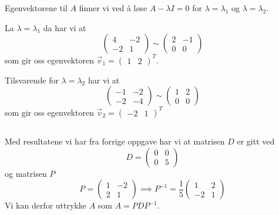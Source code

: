 \documentclass[12pt, a4paper,norsk]{article}
\newcommand{\deloppgave}{\subsection{}}
\newcommand{\inverse}{^{-1}}
\begin{document}
	Egenvektorene til $A$ finner vi ved å løse $A - \lambda I = 0$ for $\lambda = \lambda_1$ og $\lambda = \lambda_2$.
	
	La $\lambda = \lambda_1$ da har vi at
	$$
	\begin{pmatrix}
		4 & -2\\
		-2 & 1
	\end{pmatrix} \sim
	\begin{pmatrix}
		2 & -1\\
		0 & 0
	\end{pmatrix}
	$$
	som gir oss egenvektoren $\vec{v}_1 = \begin{pmatrix}1 & 2\end{pmatrix}^T$. 
	
	Tilsvarende for $\lambda = \lambda_2$ har vi at
	$$
	\begin{pmatrix}
		-1 & -2\\
		-2 & -4
	\end{pmatrix}\sim
	\begin{pmatrix}
		1 & 2\\
		0 & 0
	\end{pmatrix}
	$$
	som gir oss egenvektoren $\vec{v}_2 = \begin{pmatrix} -2 & 1 \end{pmatrix}^T$
	
	\deloppgave
	Med resultatene vi har fra forrige oppgave har vi at matrisen $D$ er gitt ved
	$$
	D = \begin{pmatrix}
		0 & 0\\
		0 & 5
	\end{pmatrix}
	$$
	og matrisen $P$
	$$
	P = \begin{pmatrix}
		1 & -2\\
		2 & 1
	\end{pmatrix}
	\implies
	P\inverse = \frac{1}{5}\begin{pmatrix}
		1 & 2\\
		-2 & 1
	\end{pmatrix}
	$$
	Vi kan derfor uttrykke $A$ som $A = PDP\inverse$.
	
\end{document}
